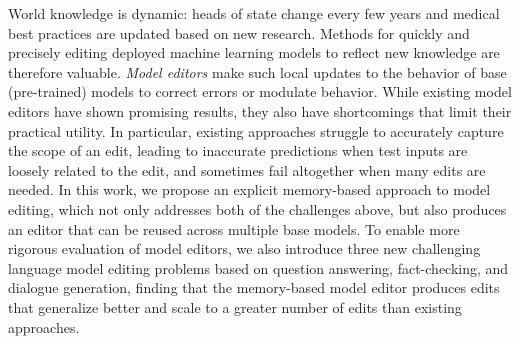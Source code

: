 
World knowledge is dynamic: heads of state change every few years and medical best practices are updated based on new research. Methods for quickly and precisely editing deployed machine learning models to reflect new knowledge are therefore valuable. \textit{Model editors} make such local updates to the behavior of base (pre-trained) models to correct errors or modulate behavior. While existing model editors have shown promising results, they also have shortcomings that limit their practical utility. In particular, existing approaches struggle to accurately capture the scope of an edit, leading to inaccurate predictions when test inputs are loosely related to the edit, and sometimes fail altogether when many edits are needed. In this work, we propose an explicit memory-based approach to model editing, which not only addresses both of the challenges above, but also produces an editor that can be reused across multiple base models. To enable more rigorous evaluation of model editors, we also introduce three new challenging language model editing problems based on question answering, fact-checking, and dialogue generation, finding that the memory-based model editor produces edits that generalize better and scale to a greater number of edits than existing approaches. 



